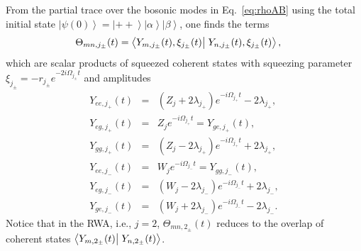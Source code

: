 \documentclass[%
reprint,
amsmath,amssymb,
aps,
pra,
]{revtex4-1}
\newcommand{\ket}[1]{\left| #1 \right>} %
\newcommand{\braket}[2]{\left< #1 \vphantom{#2} \right| \left. #2 \vphantom{#1} \right>} %
\begin{document}
From the partial trace over the bosonic modes in Eq.~\eqref{eq:rhoAB} using the total initial state $\ket{\psi(0)}=\ket{++}\ket{\alpha}\ket{\beta}$, one finds the terms \begin{eqnarray}
\!\!\!\!\!\!\!\Theta_{mn,j_\pm}(t)=\braket{Y_{m,j_\pm}(t),\xi_{j_\pm}(t)}{Y_{n,j_\pm}(t),\xi_{j_\pm}(t)},
\label{eq:scpd}
\end{eqnarray}
which are scalar products of squeezed coherent states with squeezing parameter $\xi_{j_\pm}=-r_{j_\pm}e^{-2i\Omega_{j_\pm}t}$ and amplitudes 
\begin{eqnarray}
Y_{ee,j_+}(t)&=&\left(Z_{j}+2\lambda_{j_+}\right)e^{-i\Omega_{j_+}t}-2\lambda_{j_+}, \nonumber \\
Y_{eg,j_+}(t)&=&Z_{j}e^{-i\Omega_{j_+}t}=Y_{ge,j_+}(t), \nonumber \\
Y_{gg,j_+}(t)&=&\left(Z_{j}-2\lambda_{j_+}\right)e^{-i\Omega_{j_+}t}+2\lambda_{j_+}, \nonumber \\
Y_{ee,j_-}(t)&=&W_{j}e^{-i\Omega_{j_-}t}=Y_{gg,j_-}(t), \nonumber \\
Y_{eg,j_-}(t)&=&\left(W_{j}-2\lambda_{j_-}\right)e^{-i\Omega_{j_-}t}+2\lambda_{j_-}, \nonumber \\
Y_{ge,j_-}(t)&=&\left(W_{j}+2\lambda_{j_-}\right)e^{-i\Omega_{j_-}t}-2\lambda_{j_-}.
\label{eq:Ynj}
\end{eqnarray}
Notice that in the RWA, i.e., $j=2$,  $\Theta_{mn,2_\pm}(t)$ reduces to the overlap of coherent states $\braket{Y_{m,2_\pm}(t)}{Y_{n,2_\pm}(t)}$.
\end{document}
